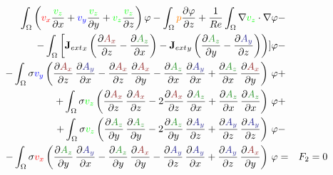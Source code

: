 \documentclass[smallextended]{svjour3}       %
\begin{document}
\begin{eqnarray}
			\int_{\Omega} \left(\textcolor{red}{v_x} \frac{\textcolor{green}{v_z}}{\partial x} + \textcolor{blue}{v_y} \frac{\textcolor{green}{v_z}}{\partial y} + \textcolor{green}{v_z} \frac{\textcolor{green}{v_z}}{\partial z}\right) \varphi
			- \int_{\Omega} \textcolor{orange}{p} \frac{\partial \varphi}{\partial z}
			+ \frac{1}{Re} \int_{\Omega} \nabla \textcolor{green}{v_z} \cdot \nabla \varphi \nonumber & -\\
			- \int_{\Omega} \left[{\mathbf{J}_{ext}}_x \left(\frac{\partial \textcolor{darkRed}{A_x}}{\partial z} - \frac{\partial \textcolor{darkGreen}{A_z}}{\partial x}\right) - {\mathbf{J}_{ext}}_y \left(\frac{\partial \textcolor{darkGreen}{A_z}}{\partial y} - \frac{\partial \textcolor{darkBlue}{A_y}}{\partial z}\right)\right)] \varphi			
			\nonumber & -\\			- \int_{\Omega} \sigma \textcolor{blue}{v_y} \left(\frac{\partial \textcolor{darkRed}{A_x}}{\partial z}\,\frac{\partial \textcolor{darkBlue}{A_y}}{\partial x} - \frac{\partial \textcolor{darkRed}{A_x}}{\partial z}\,\frac{\partial \textcolor{darkRed}{A_x}}{\partial y} - \frac{\partial \textcolor{darkGreen}{A_z}}{\partial x}\,\frac{\partial \textcolor{darkBlue}{A_y}}{\partial x}  + \frac{\partial \textcolor{darkGreen}{A_z}}{\partial x}\,\frac{\partial \textcolor{darkRed}{A_x}}{\partial y} \right)\, \varphi& +\nonumber \\			
			+ \int_{\Omega} \sigma \textcolor{green}{v_z} \left(\frac{\partial \textcolor{darkRed}{A_x}}{\partial z}\,\frac{\partial \textcolor{darkRed}{A_x}}{\partial z} - 2 \frac{\partial \textcolor{darkRed}{A_x}}{\partial z}\,\frac{\partial \textcolor{darkGreen}{A_z}}{\partial x} + \frac{\partial \textcolor{darkGreen}{A_z}}{\partial x}\,\frac{\partial \textcolor{darkGreen}{A_z}}{\partial x} \right)\, \varphi& +\nonumber \\			
			+ \int_{\Omega} \sigma \textcolor{green}{v_z} \left(\frac{\partial \textcolor{darkGreen}{A_z}}{\partial y}\,\frac{\partial \textcolor{darkGreen}{A_z}}{\partial y} - 2 \frac{\partial \textcolor{darkGreen}{A_z}}{\partial y}\,\frac{\partial \textcolor{darkBlue}{A_y}}{\partial z} + \frac{\partial \textcolor{darkBlue}{A_y}}{\partial z}\,\frac{\partial \textcolor{darkBlue}{A_y}}{\partial z} \right)\, \varphi& -\nonumber \\			
			- \int_{\Omega} \sigma \textcolor{red}{v_x} \left(\frac{\partial \textcolor{darkGreen}{A_z}}{\partial y}\,\frac{\partial \textcolor{darkBlue}{A_y}}{\partial x} - \frac{\partial \textcolor{darkGreen}{A_z}}{\partial y}\,\frac{\partial \textcolor{darkRed}{A_x}}{\partial y} - \frac{\partial \textcolor{darkBlue}{A_y}}{\partial z}\,\frac{\partial \textcolor{darkBlue}{A_y}}{\partial x} + \frac{\partial \textcolor{darkBlue}{A_y}}{\partial z}\,\frac{\partial \textcolor{darkRed}{A_x}}{\partial y} \right)\, \varphi& = & F_2 = 0 \\				

\end{eqnarray}
\end{document}
